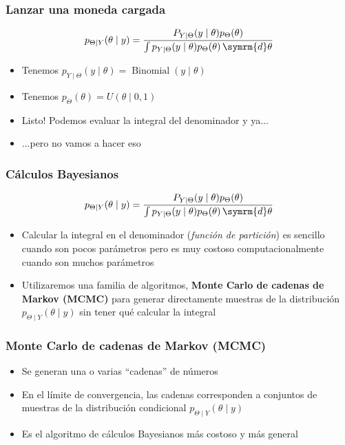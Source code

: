 \documentclass[xcolor=dvipsnames,10pt]{beamer}
\begin{document}
%
\begin{frame}
  \frametitle{Lanzar una moneda cargada}
  \begin{equation*}
    p_{\Theta \mid Y}(\theta \mid y) = \frac{P_{Y \mid \Theta}(y \mid \theta) p_{\Theta}(\theta)}{\int p_{Y \mid \Theta}(y \mid \theta) p_{\Theta}(\theta) \, \symrm{d} \theta}
  \end{equation*}
  \begin{itemize}
  \item Tenemos $p_{Y \mid \Theta}(y \mid \theta) = \operatorname{Binomial}(y \mid \theta)$
  \item Tenemos $p_{\Theta}(\theta) = U(\theta \mid 0, 1)$
  \item Listo! Podemos evaluar la integral del denominador y ya...
  \item ...pero no vamos a hacer eso
  \end{itemize}
\end{frame}
%
\begin{frame}
  \frametitle{Cálculos Bayesianos}
  \begin{equation*}
    p_{\Theta \mid Y}(\theta \mid y) = \frac{P_{Y \mid \Theta}(y \mid \theta) p_{\Theta}(\theta)}{\int p_{Y \mid \Theta}(y \mid \theta) p_{\Theta}(\theta) \, \symrm{d} \theta}
  \end{equation*}
  \begin{itemize}
  \item Calcular la integral en el denominador (\emph{función de partición}) es sencillo cuando son pocos parámetros pero es muy costoso computacionalmente cuando son muchos parámetros
  \item Utilizaremos una familia de algoritmos, \textbf{Monte Carlo de cadenas de Markov (MCMC)} para generar directamente muestras de la distribución $p_{\Theta \mid Y}(\theta \mid y)$ sin tener qué calcular la integral
  \end{itemize}
\end{frame}
%
\begin{frame}
  \frametitle{Monte Carlo de cadenas de Markov (MCMC)}
  \begin{itemize}
  \item Se generan una o varias ``cadenas'' de números
  \item En el límite de convergencia, las cadenas corresponden a conjuntos de muestras de la distribución condicional $p_{\Theta \mid Y}(\theta \mid y)$
  \item Es el algoritmo de cálculos Bayesianos más costoso y más general
  \end{itemize}
\end{frame}
%
\begin{frame}
  \pythonframe
\end{frame}
\end{document}
